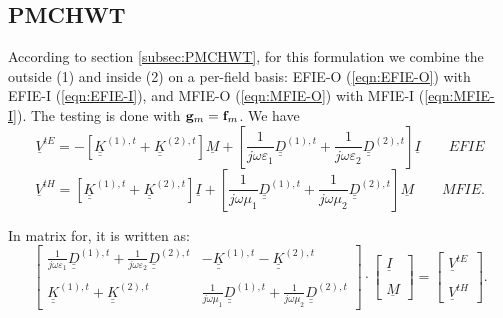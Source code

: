 \subsection{PMCHWT}
%
\par
According to section \ref{subsec:PMCHWT}, for this formulation we combine the outside (1) and inside (2) on a per-field basis: EFIE-O (\ref{eqn:EFIE-O}) with EFIE-I (\ref{eqn:EFIE-I}), and MFIE-O (\ref{eqn:MFIE-O}) with MFIE-I (\ref{eqn:MFIE-I}). The testing is done with $\mathbf{g}_m = \mathbf{f}_m$. We have
\begin{equation}\label{eqn:Matrix EFIE}
\boxed{\underline{V}^{tE} =  -\left[\underline{\underline{K}}^{(1),t} + \underline{\underline{K}}^{(2),t} \right] \underline{M} + \left[\frac{1}{j \omega \varepsilon_1}  \underline{\underline{D}}^{(1),t} + \frac{1}{j \omega \varepsilon_2}  \underline{\underline{D}}^{(2),t}\right] \underline{I} } \qquad EFIE 
\end{equation}
\begin{equation}\label{eqn:Matrix MFIE}
\boxed{\underline{V}^{tH} =  \left[\underline{\underline{K}}^{(1),t} + \underline{\underline{K}}^{(2),t} \right] \underline{I} + \left[\frac{1}{j \omega \mu_1}  \underline{\underline{D}}^{(1),t} + \frac{1}{j \omega \mu_2}  \underline{\underline{D}}^{(2),t}\right] \underline{M} } \qquad MFIE.
\end{equation}
%
\par
In matrix for, it is written as:
\begin{equation}
\left[
\begin{matrix}
  \frac{1}{j \omega \varepsilon_1} \underline{\underline{D}}^{(1), t} + \frac{1}{j \omega \varepsilon_2} \underline{\underline{D}}^{(2), t} & -\underline{\underline{K}}^{(1),t} - \underline{\underline{K}}^{(2),t}  \\ \\
  \underline{\underline{K}}^{(1),t} + \underline{\underline{K}}^{(2),t} & \frac{1}{j \omega \mu_1}\underline{\underline{D}}^{(1), t} + \frac{1}{j \omega \mu_2} \underline{\underline{D}}^{(2), t}
\end{matrix}
\right]
\cdot 
\left[
\begin{matrix}
  \underline{I} \\ \\
  \underline{M}  
\end{matrix}
\right]
=
\left[
\begin{matrix}
  \underline{V}^{tE} \\ \\
  \underline{V}^{tH}
\end{matrix}
\right].
\end{equation}



